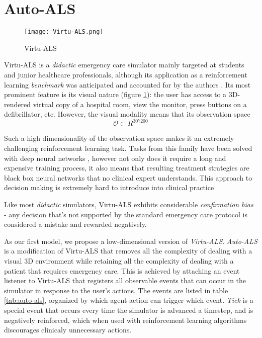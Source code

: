 \newpage
\section{Auto-ALS}
\label{sec:virtu-als}


\begin{figure}
    \centering
    \texttt{[image: Virtu-ALS.png]}
    \caption{Virtu-ALS}
    \label{fig:virtu-als}
\end{figure}

Virtu-ALS is a \emph{didactic} emergency care simulator mainly targeted at students and junior healthcare professionals, although its application as a reinforcement learning \emph{benchmark} was anticipated and accounted for by the authors \cite{briskAIEnhanceInteractive2018}.
Its most prominent feature is its visual nature (figure \ref{fig:virtu-als}): the user has access to a 3D-rendered virtual copy of a hospital room, view the monitor, press buttons on a defibrillator, etc.
However, the visual modality means that its observation space 
\begin{equation}
    \mathcal{O} \subset R^{307200}
\end{equation}

Such a high dimensionality of the observation space makes it an extremely challenging reinforcement learning task.
Tasks from this family have been solved with deep neural networks \cite{mnihPlayingAtariDeep2013}, however not only does it require a long and expensive training process, it also means that resulting treatment strategies are black box neural networks that no clinical expert understands.
This approach to decision making is extremely hard to introduce into clinical practice \cite{priceBigDataBlackbox2018,watsonClinicalApplicationsMachine2019}

Like most \emph{didactic} simulators, Virtu-ALS exhibits considerable \emph{confirmation bias} - any decision that's not supported by the standard emergency care protocol \cite{thimInitialAssessmentTreatment2012} is considered a mistake and rewarded negatively.

As our first model, we propose a low-dimensional version of \emph{Virtu-ALS}.
\emph{Auto-ALS} is a modification of Virtu-ALS that removes all the complexity of dealing with a visual 3D environment while retaining all the complexity of dealing with a patient that requires emergency care.
This is achieved by attaching an event listener to Virtu-ALS that registers all observable events that can occur in the simulator in response to the user's actions.
The events are listed in table \ref{tab:auto-als}, organized by which agent action can trigger which event.
\emph{Tick} is a special event that occurs every time the simulator is advanced a timestep, and is negatively reinforced, which when used with reinforcement learning algorithms discourages clinicaly unnecessary actions.

